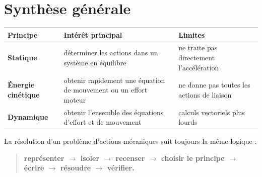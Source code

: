 \section{Synthèse générale}

\begin{center}
\small
\begin{tabularx}{\linewidth}{>{\bfseries}l X X}
\toprule
Principe & Intérêt principal & Limites \\
\midrule
Statique & déterminer les actions dans un système en équilibre & ne traite pas directement l'accélération \\
Énergie cinétique & obtenir rapidement une équation de mouvement ou un effort moteur & ne donne pas toutes les actions de liaison \\
Dynamique & obtenir l'ensemble des équations d'effort et de mouvement & calculs vectoriels plus lourds \\
\bottomrule
\end{tabularx}
\end{center}

La résolution d'un problème d'actions mécaniques suit toujours la même logique :
\begin{quote}
\centering
\textbf{représenter $\rightarrow$ isoler $\rightarrow$ recenser $\rightarrow$ choisir le principe $\rightarrow$ écrire $\rightarrow$ résoudre $\rightarrow$ vérifier.}
\end{quote}
